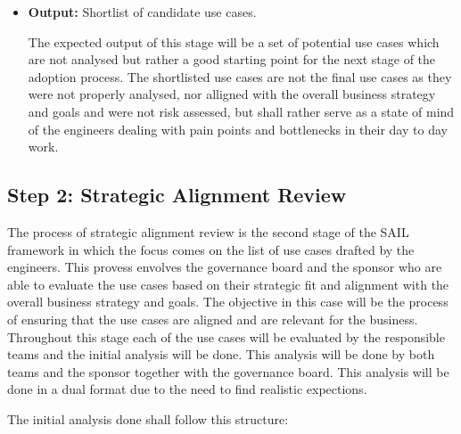 \documentclass[]{imc-inf}
\begin{document}
\begin{itemize}
	The decision point whether to proceed, iterate or abandon the
	opportunity scouting stage will be based on the question ``Is this use
	case strategically relevant and feasible?''. The question shall be
	asked for every single one of the potentially identified and outlined
	usecases as it determines winners from losers. This question however
	dos not focus on strategy nor business alignment, it is rather a
	feasibility check to the round of engineers, whether this usecase
	occurs regularly or it does not need AI as a solution.
	\item
	\textbf{Output:} Shortlist of candidate use cases.
	
	The expected output of this stage will be a set of potential use cases
	which are not analysed but rather a good starting point for the next
	stage of the adoption process. The shortlisted use cases are not the
	final use cases as they were not properly analysed, nor alligned with
	the overall business strategy and goals and were not risk assessed,
	but shall rather serve as a state of mind of the engineers dealing
	with pain points and bottlenecks in their day to day work.
\end{itemize}

\subsection{Step 2: Strategic Alignment
	Review}\label{step-2-strategic-alignment-review}

The process of strategic alignment review is the second stage of the
SAIL framework in which the focus comes on the list of use cases drafted
by the engineers. This provess envolves the governance board and the
sponsor who are able to evaluate the use cases based on their strategic
fit and alignment with the overall business strategy and goals. The
objective in this case will be the process of ensuring that the use
cases are aligned and are relevant for the business. Throughout this
stage each of the use cases will be evaluated by the responsible teams
and the initial analysis will be done. This analysis will be done by
both teams and the sponsor together with the governance board. This
analysis will be done in a dual format due to the need to find realistic
expections.

The initial analysis done shall follow this structure:
\end{document}
